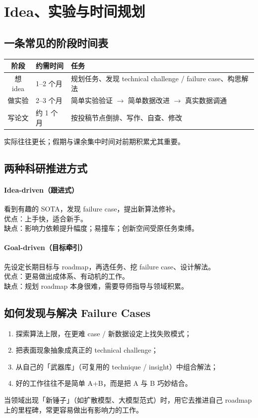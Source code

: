\section{Idea、实验与时间规划}

\subsection{一条常见的阶段时间表}
\begin{center}
\begin{tabular}{clp{7.2cm}}
\toprule
阶段 & 约需时间 & 任务 \\
\midrule
想 idea & 1--2 个月 & 规划任务、发现 technical challenge / failure case、构思解法 \\
做实验 & 2--3 个月 & 简单实验验证 $\rightarrow$ 简单数据改进 $\rightarrow$ 真实数据调通 \\
写论文 & 约 1 个月 & 按投稿节点倒排、写作、自查、修改 \\
\bottomrule
\end{tabular}
\end{center}
实际往往更长；假期与课余集中时间对前期积累尤其重要。

\subsection{两种科研推进方式}
\paragraph{Idea-driven（跟进式）}
看到有趣的 SOTA，发现 failure case，提出新算法修补。\\
优点：上手快，适合新手。\\
缺点：影响力依赖提升幅度；易撞车；创新空间受原任务束缚。

\paragraph{Goal-driven（目标牵引）}
先设定长期目标与 roadmap，再选任务、挖 failure case、设计解法。\\
优点：更易做出成体系、有动机的工作。\\
缺点：规划 roadmap 本身很难，需要导师指导与领域积累。

\subsection{如何发现与解决 Failure Cases}
\begin{enumerate}
  \item 探索算法上限，在更难 case / 新数据设定上找失败模式；
  \item 把表面现象抽象成真正的 technical challenge；
  \item 从自己的「武器库」（可复用的 technique / insight）中组合解法；
  \item 好的工作往往不是简单 A+B，而是把 A 与 B 巧妙结合。
\end{enumerate}
当领域出现「新锤子」（如扩散模型、大模型范式）时，用它去推进自己 roadmap 上的里程碑，常更容易做出有影响力的工作。

